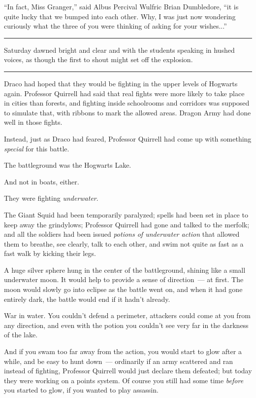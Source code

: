 ``In fact, Miss Granger,'' said Albus Percival Wulfric Brian Dumbledore, ``it is quite lucky that we bumped into each other. Why, I was just now wondering curiously what the three of you were thinking of asking for your wishes...''

\begin{center}\rule{3in}{0.4pt}\end{center}

Saturday dawned bright and clear and with the students speaking in hushed voices, as though the first to shout might set off the explosion.

\begin{center}\rule{3in}{0.4pt}\end{center}

Draco had hoped that they would be fighting in the upper levels of Hogwarts again. Professor Quirrell had said that real fights were more likely to take place in cities than forests, and fighting inside schoolrooms and corridors was supposed to simulate that, with ribbons to mark the allowed areas. Dragon Army had done well in those fights.

Instead, just as Draco had feared, Professor Quirrell had come up with something \emph{special} for this battle.

The battleground was the Hogwarts Lake.

And not in boats, either.

They were fighting \emph{underwater}.

The Giant Squid had been temporarily paralyzed; spells had been set in place to keep away the grindylows; Professor Quirrell had gone and talked to the merfolk; and all the soldiers had been issued \emph{potions of underwater action} that allowed them to breathe, see clearly, talk to each other, and swim not quite as fast as a fast walk by kicking their legs.

A huge silver sphere hung in the center of the battleground, shining like a small underwater moon. It would help to provide a sense of direction~--- at first. The moon would slowly go into eclipse as the battle went on, and when it had gone entirely dark, the battle would end if it hadn't already.

War in water. You couldn't defend a perimeter, attackers could come at you from any direction, and even with the potion you couldn't see very far in the darkness of the lake.

And if you swam too far away from the action, you would start to glow after a while, and be easy to hunt down~--- ordinarily if an army scattered and ran instead of fighting, Professor Quirrell would just declare them defeated; but today they were working on a points system. Of course you still had some time \emph{before} you started to glow, if you wanted to play assassin.


